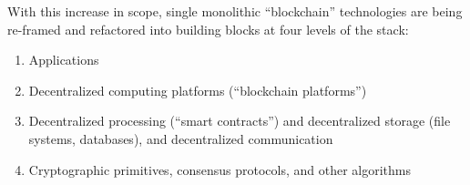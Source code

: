 With this increase in scope, single monolithic ``blockchain'' technologies are being re-framed and refactored into building blocks at four levels of the stack:
\begin{enumerate}
 \item Applications
 \item Decentralized computing platforms (``blockchain platforms'')
 \item Decentralized processing (``smart contracts'') and decentralized storage (file systems, databases), and decentralized communication
 \item Cryptographic primitives, consensus protocols, and other algorithms
\end{enumerate}
